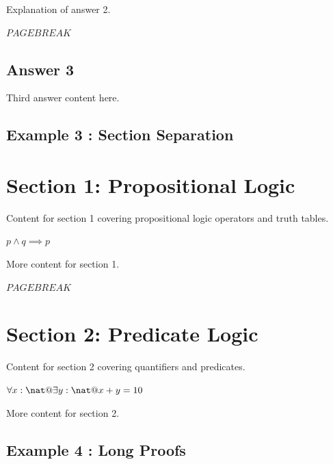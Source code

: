 \documentclass[a4paper,10pt,fleqn]{article}
\begin{document}
\noindent Explanation of answer 2.

\bigskip

\noindent
$PAGEBREAK$


\subsection*{Answer 3}

\noindent Third answer content here.

\bigskip

\subsection*{Example 3 : Section Separation}

\section*{Section 1: Propositional Logic}

\noindent Content for section 1 covering propositional logic operators and truth tables.

\bigskip

\noindent
$p \land q \implies p$


\noindent More content for section 1.

\bigskip

\noindent
$PAGEBREAK$


\section*{Section 2: Predicate Logic}

\noindent Content for section 2 covering quantifiers and predicates.

\bigskip

\noindent
$\forall x : \nat @ \exists y : \nat @ x + y = 10$


\noindent More content for section 2.

\bigskip

\subsection*{Example 4 : Long Proofs}
\end{document}
